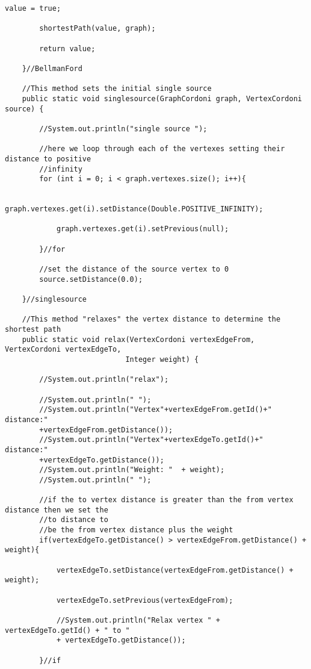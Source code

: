\documentclass[letterpaper, 10pt,DIV=13]{scrartcl}
\numberwithin{equation}{section} %
\numberwithin{figure}{section} %
\numberwithin{table}{section} %
\begin{document}
\begin{lstlisting}[frame=single, ]
        value = true;

        shortestPath(value, graph);

        return value;

    }//BellmanFord

    //This method sets the initial single source
    public static void singlesource(GraphCordoni graph, VertexCordoni source) {

        //System.out.println("single source ");

        //here we loop through each of the vertexes setting their distance to positive 
        //infinity
        for (int i = 0; i < graph.vertexes.size(); i++){

            graph.vertexes.get(i).setDistance(Double.POSITIVE_INFINITY);

            graph.vertexes.get(i).setPrevious(null);
        
        }//for

        //set the distance of the source vertex to 0
        source.setDistance(0.0);
    
    }//singlesource

    //This method "relaxes" the vertex distance to determine the shortest path
    public static void relax(VertexCordoni vertexEdgeFrom, VertexCordoni vertexEdgeTo, 
                            Integer weight) {

        //System.out.println("relax");

        //System.out.println(" ");
        //System.out.println("Vertex"+vertexEdgeFrom.getId()+" distance:"
        +vertexEdgeFrom.getDistance());
        //System.out.println("Vertex"+vertexEdgeTo.getId()+" distance:"
        +vertexEdgeTo.getDistance());
        //System.out.println("Weight: "  + weight);
        //System.out.println(" ");

        //if the to vertex distance is greater than the from vertex distance then we set the 
        //to distance to 
        //be the from vertex distance plus the weight
        if(vertexEdgeTo.getDistance() > vertexEdgeFrom.getDistance() + weight){

            vertexEdgeTo.setDistance(vertexEdgeFrom.getDistance() + weight);

            vertexEdgeTo.setPrevious(vertexEdgeFrom);

            //System.out.println("Relax vertex " + vertexEdgeTo.getId() + " to " 
            + vertexEdgeTo.getDistance());

        }//if


\end{lstlisting}
\end{document}
